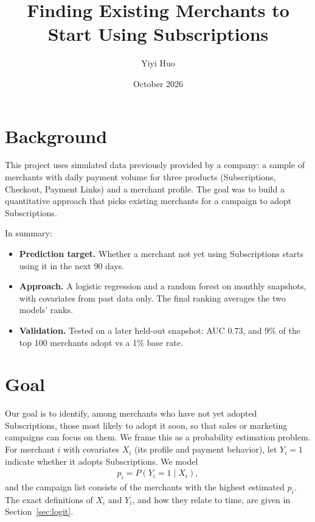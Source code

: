 \documentclass[11pt]{article}
\title{Finding Existing Merchants to Start Using Subscriptions}
\author{Yiyi Huo}
\date{October 2026}
\begin{document}
\maketitle

\section*{Background}

This project uses simulated data previously provided by a company: a sample of merchants with daily payment volume for three products (Subscriptions, Checkout, Payment Links) and a merchant profile. The goal was to build a quantitative approach that picks existing merchants for a campaign to adopt Subscriptions.

In summary:
\begin{itemize}
  \item \textbf{Prediction target.} Whether a merchant not yet using Subscriptions starts using it in the next 90 days.
  \item \textbf{Approach.} A logistic regression and a random forest on monthly snapshots, with covariates from past data only. The final ranking averages the two models' ranks.
  \item \textbf{Validation.} Tested on a later held-out snapshot: AUC 0.73, and 9\% of the top 100 merchants adopt vs a 1\% base rate.
\end{itemize}

\section{Goal}\label{sec:goal}

Our goal is to identify, among merchants who have not yet adopted Subscriptions, those most likely to adopt it soon, so that sales or marketing campaigns can focus on them. We frame this as a probability estimation problem. For merchant $i$ with covariates $X_i$ (its profile and payment behavior), let $Y_i = 1$ indicate whether it adopts Subscriptions. We model
\begin{align*}
p_i = P(Y_i = 1 \mid X_i),
\end{align*}
and the campaign list consists of the merchants with the highest estimated $\hat p_i$. The exact definitions of $X_i$ and $Y_i$, and how they relate to time, are given in Section~\ref{sec:logit}.
\end{document}
